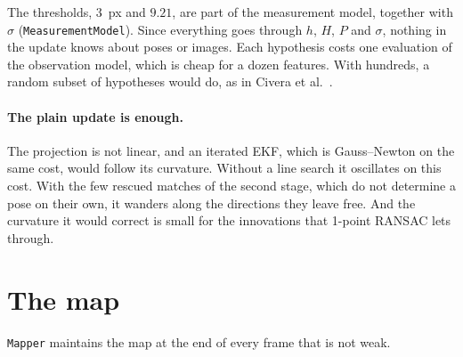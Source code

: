 \documentclass[11pt]{article}
\begin{document}
The thresholds, $3$~px and $9.21$, are part of the measurement model, together with $\sigma$
(\texttt{MeasurementModel}). Since everything goes through $h$, $H$, $P$ and $\sigma$, nothing in
the update knows about poses or images. Each hypothesis costs one evaluation of the observation
model, which is cheap for a dozen features. With hundreds, a random subset of hypotheses would do,
as in Civera et al.~\cite{civera2010}.

\paragraph{The plain update is enough.}
The projection is not linear, and an iterated EKF, which is Gauss--Newton on the same cost, would
follow its curvature. Without a line search it oscillates on this cost. With the few rescued
matches of the second stage, which do not determine a pose on their own, it wanders along the
directions they leave free. And the curvature it would correct is small for the innovations that
1-point RANSAC lets through.

\section{The map}
\label{sec:map}

\texttt{Mapper} maintains the map at the end of every frame that is not weak.
\end{document}
